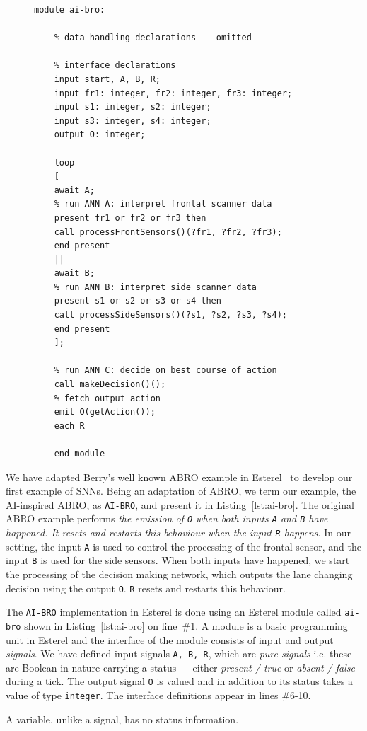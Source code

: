 \begin{figure}[htb]
	\begin{lstlisting}[caption={Esterel implementation of \texttt{AI-BRO}},label={lst:ai-bro}]
	module ai-bro:
	
	% data handling declarations -- omitted 
	
	% interface declarations
	input start, A, B, R;
	input fr1: integer, fr2: integer, fr3: integer;
	input s1: integer, s2: integer;
	input s3: integer, s4: integer;
	output O: integer;
	
	loop
	[
	await A;
	% run ANN A: interpret frontal scanner data
	present fr1 or fr2 or fr3 then
	call processFrontSensors()(?fr1, ?fr2, ?fr3);
	end present
	||
	await B;
	% run ANN B: interpret side scanner data
	present s1 or s2 or s3 or s4 then
	call processSideSensors()(?s1, ?s2, ?s3, ?s4);
	end present
	];
	
	% run ANN C: decide on best course of action 
	call makeDecision()();
	% fetch output action
	emit O(getAction());
	each R
	
	end module
	\end{lstlisting}
\end{figure}

We have adapted Berry's well known ABRO example in Esterel~\cite{berry2000foundations} to develop our first example of 
\acp{SNN}. Being an adaptation of ABRO, we term our example, the AI-inspired ABRO, as \texttt{AI-BRO}, and present it in Listing~\ref{lst:ai-bro}.
The original ABRO example performs \emph{the emission of \texttt{O} when both inputs \texttt{A} and \texttt{B} 
	have happened. It resets and restarts this behaviour when the input \texttt{R} happens}. In our setting, the input 
\texttt{A} is used to control the processing of the frontal sensor, and the input \texttt{B} is used for the side sensors.
When both inputs have happened, we start the processing of the decision making network, which outputs the 
lane changing decision using the output \texttt{O}. \texttt{R} resets and restarts this behaviour.

The \texttt{AI-BRO} implementation in Esterel is done using an Esterel module called \texttt{ai-bro} shown in Listing~\ref{lst:ai-bro} on line~\#1.
A module is a basic programming unit in Esterel and the interface of the module consists of input and
output \emph{signals}. We have defined input signals \texttt{A, B, R}, which are \emph{pure signals}
i.e. these are Boolean in nature carrying a status --- either \emph{present / true} or \emph{absent / false} during a tick. The output signal 
\texttt{O} is valued and in addition to its status takes a value of type \texttt{integer}. The interface definitions appear in 
lines \#6-10. %
A variable, unlike a signal, has no status information. 

